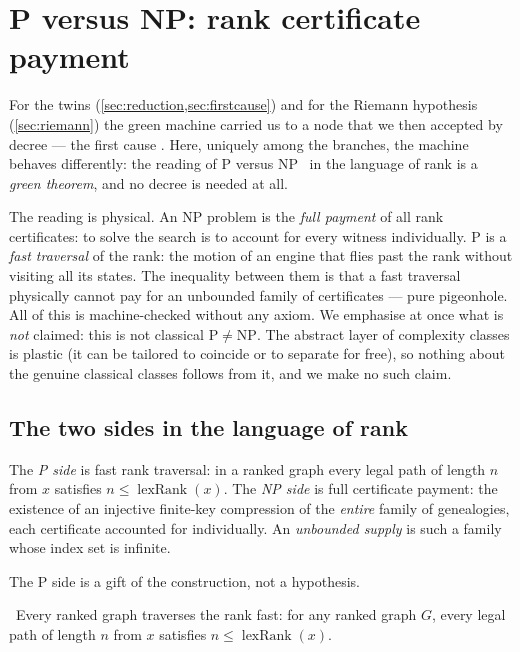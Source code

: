 \section{P versus NP: rank certificate payment}\label{sec:pnp}

For the twins (\cref{sec:reduction,sec:firstcause}) and for the Riemann hypothesis
(\cref{sec:riemann}) the green machine carried us to a node that we then accepted by decree ---
the first cause \axiom{}. Here, uniquely among the branches, the machine behaves differently:
the reading of $\mathrm{P}$ versus $\mathrm{NP}$~\cite{clay-pnp} in the language of rank is a
\emph{green theorem}, and no decree is needed at all.

The reading is physical. An $\mathrm{NP}$ problem is the \emph{full payment} of all rank
certificates: to solve the search is to account for every witness individually. $\mathrm{P}$ is a
\emph{fast traversal} of the rank: the motion of an engine that flies past the rank without
visiting all its states. The inequality between them is that a fast traversal physically cannot
pay for an unbounded family of certificates --- pure pigeonhole. All of this is machine-checked
without any axiom. We emphasise at once what is \emph{not} claimed: this is not classical
$\mathrm{P}\neq\mathrm{NP}$. The abstract layer of complexity classes is plastic (it can be tailored
to coincide or to separate for free), so nothing about the genuine classical classes follows from
it, and we make no such claim.

\subsection{The two sides in the language of rank}

\begin{definition}\label{def:pnp-sides}
The \emph{P side} is fast rank traversal: in a ranked graph every legal path of length $n$ from $x$
satisfies $n \le \operatorname{lexRank}(x)$. The \emph{NP side} is full certificate payment: the
existence of an injective finite-key compression of the \emph{entire} family of genealogies, each
certificate accounted for individually. An \emph{unbounded supply} is such a family whose index set
is infinite. 
\end{definition}

The P side is a gift of the construction, not a hypothesis.

\begin{theorem}\label{thm:rankFastTraversal_holds}
\green{}\ Every ranked graph traverses the rank fast: for any ranked graph $G$, every legal path of
length $n$ from $x$ satisfies $n \le \operatorname{lexRank}(x)$. 
\end{theorem}

